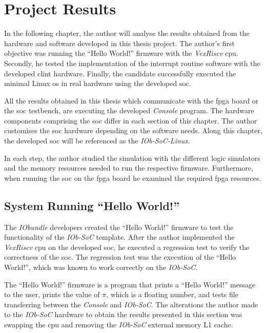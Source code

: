 \chapter{Project Results}
\label{chapter:project_results}
In the following chapter, the author will analyse the results obtained from the hardware and software developed in this thesis project. The author's first objective was running the \enquote{Hello World!} firmware with the \textit{VexRiscv} \acrshort{cpu}. Secondly, he tested the implementation of the interrupt routine software with the developed \acrshort{clint} hardware. Finally, the candidate successfully executed the minimal Linux \acrshort{os} in real hardware using the developed \acrlong{soc}.

All the results obtained in this thesis which communicate with the \acrshort{fpga} board or the \acrshort{soc} testbench, are executing the developed \textit{Console} program. The hardware components comprising the \acrshort{soc} differ in each section of this chapter. The author customises the \acrshort{soc} hardware depending on the software needs. Along this chapter, the developed \acrshort{soc} will be referenced as the \textit{IOb-SoC-Linux}.

In each step, the author studied the simulation with the different logic simulators and the memory resources needed to run the respective firmware. Furthermore, when running the \acrshort{soc} on the \acrshort{fpga} board he examined the required \acrshort{fpga} resources.

\section{System Running \enquote{Hello World!}}
\label{section:hello_world}
The \textit{IObundle} developers created the \enquote{Hello World!} firmware to test the functionality of the \textit{IOb-SoC} template. After the author implemented the \textit{VexRiscv} \acrshort{cpu} on the developed \acrshort{soc}, he executed a regression test to verify the correctness of the \acrshort{soc}. The regression test was the execution of the \enquote{Hello World!}, which was known to work correctly on the \textit{IOb-SoC}.

The \enquote{Hello World!} firmware is a program that prints a \enquote{Hello World!} message to the user, prints the value of $\pi$, which is a floating number, and tests file transferring between the \textit{Console} and \textit{IOb-SoC}. The alterations the author made to the \textit{IOb-SoC} hardware to obtain the results presented in this section was swapping the \acrshort{cpu} and removing the \textit{IOb-SoC} external memory L1 cache.

